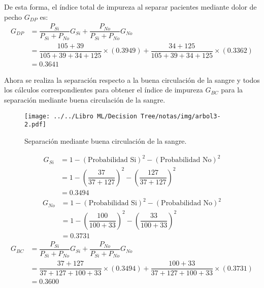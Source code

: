 \documentclass[
10pt, %
a4paper, %
]{article}
\begin{document}
De esta forma, el índice total de impureza al separar pacientes mediante dolor de pecho $G_{DP}$ es:
\begin{align*}
	G_{DP} &= \dfrac{P_{Si}}{P_{Si} + P_{No}}G_{Si} + \dfrac{P_{No}}{P_{Si}+P_{No}}G_{No} \\
		&= \dfrac{105+39}{105+39+34+125}\times (0.3949) + \dfrac{34+125}{105+39+34+125}\times (0.3362) \\
		&= 0.3641
\end{align*}

Ahora se realiza la separación respecto a la buena circulación de la sangre y todos los cálculos correspondientes para obtener el índice de impureza $G_{BC}$ 
para la separación mediante buena circulación de la sangre.

\begin{figure}[H]
	\centering
	\texttt{[image: ../../Libro ML/Decision Tree/notas/img/arbol3-2.pdf]}
	\caption{Separación mediante buena circulación de la sangre.}
	\label{fig:arbol3-2}
\end{figure}
\begin{align*}
	G_{Si} &= 1 - (\mbox{Probabilidad Si})^2 - (\mbox{Probabilidad No})^2  \\
		&= 1-\left(\dfrac{37}{37+127}\right)^2 -\left(\dfrac{127}{37+127} \right)^2\\
		&= 0.3494
\end{align*}
\begin{align*}
	G_{No} &= 1- (\mbox{Probabilidad Si})^2 - (\mbox{Probabilidad No})^2  \\
		&= 1-\left(\dfrac{100}{100+33}\right)^2 -\left(\dfrac{33}{100+33} \right)^2\\
		&= 0.3731
\end{align*}
\begin{align*}
	G_{BC} &= \dfrac{P_{Si}}{P_{Si} + P_{No}}G_{Si} + \dfrac{P_{No}}{P_{Si}+P_{No}}G_{No} \\
		&= \dfrac{37+127}{37+127+100+33}\times (0.3494) + \dfrac{100+33}{37+127+100+33}\times (0.3731) \\
		&= 0.3600
\end{align*}
\end{document}
